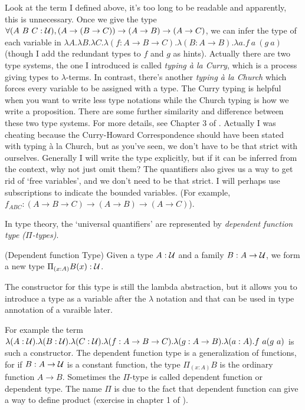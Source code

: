 Look at the term I defined above, it's too long to be readable and apparently, 
this is unnecessary. Once we give the type $\forall (A\ B\ C:\mathcal{U}), 
(A\to(B\to C))\to(A\to B)\to (A\to C)$, we can infer the type of each 
variable in $\lambda A.\lambda B. \lambda C. \lambda (f: A\to B\to C). 
\lambda (B: A\to B).\lambda a. f\ a\ (g\ a)$ (though I add the redundant
types to $f$ and $g$ as hints). Actually there are two type systems, the
one I introduced is called {\it typing \`a la Curry}, which is a process
giving types to $\lambda$-terms. In contrast, there's another {\it typing
\`a la Church} which forces every variable to be assigned with a type.
The Curry typing is helpful when you want to write less type notations 
while the Church typing is how we write a proposition. There are some
further similarity and difference between these two type systems. For
more details, see Chapter 3 of \cite{Curry-Howard}. Actually I was
cheating because the Curry-Howard Correspondence should have been stated
with typing \`a la Church, but as you've seen, we don't have to be that 
strict with ourselves. Generally I will write the type explicitly, but if 
it can be inferred from the context, why not just omit them? The 
quantifiers also gives us a way to get rid of `free variables', and we 
don't need to be that strict. I will perhaps use subscriptions to 
indicate the bounded variables.
(For example, $f_{ABC}: (A\to B\to C)\to(A\to B)\to(A\to C)$).

In type theory, the `universal quantifiers' are represented by {\it
dependent function type ($\Pi$-types)}.

\begin{definition}
    \label{dependent-function}
    (Dependent function Type) Given a type $A:\mathcal{U}$ and a family 
    $B:A\to\mathcal{U}$, we form a new type $\Pi_{(x:A)}B(x): \mathcal{U}$.

    The constructor for this type is still the lambda abstraction,
    but it allows you to introduce a type as a variable after the $\lambda$
    notation and that can be used in type annotation of a varaible later.

\end{definition}

For example the term $\lambda (A:\mathcal{U}).\lambda (B:\mathcal{U}).\lambda (C:\mathcal{U}).\lambda (f: A\to B\to C).
\lambda (g: A\to B).\lambda (a: A). f\ a (g\ a)$ is such a constructor.
The dependent function type is a generalization of functions, for if
$B:A\to\mathcal{U}$ is a constant function, the type $\Pi_{(x:A)}B$ is
the ordinary function $A\to B$. Sometimes the $\Pi$-type is called 
dependent function or dependent type. The name $\Pi$ is due to the fact
that dependent function can give a way to define product (exercise in
chapter 1 of \cite{homotopy-type-theory}).

